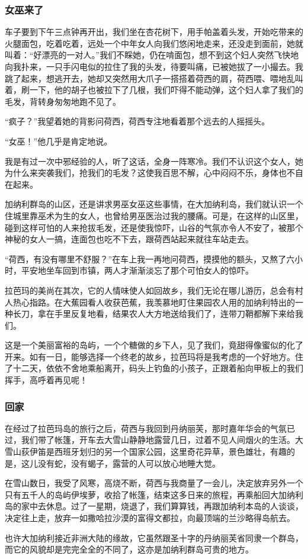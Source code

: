 \subsubsection*{女巫来了}
\par 车子要到下午三点钟再开出，我们坐在杏花树下，用手帕盖着头发，开始吃带来的火腿面包，吃着吃着，远处一个中年女人向我们悠闲地走来，还没走到面前，她就叫着：“好漂亮的一对人。”我们不睬她，仍在啃面包，想不到这个妇人突然飞快地向我扑来，一只手闪电似的拉住了我的头发，待要叫痛，已被她拔了一小撮去。我跳了起来，想逃开去，她却又突然用大爪子一搭搭着荷西的肩，荷西喂、喂地乱叫着，刷一下，他的胡子也被拉下了几根，我们吓得不能动弹，这个妇人拿了我们的毛发，背转身匆匆地跑不见了。
\par “疯子？”我望着她的背影问荷西，荷西专注地看着那个远去的人摇摇头。
\par “女巫！”他几乎是肯定地说。
\par 我是有过一次中邪经验的人，听了这话，全身一阵寒冷。我们不认识这个女人，她为什么来突袭我们，抢我们的毛发？这使我百思不解，心中闷闷不乐，身体也不自在起来。
\par 加纳利群岛的山区，还是讲求男巫女巫这些事情，在大加纳利岛，我们就认识一个住城里靠巫术为生的女人，也曾给男巫医治过我的腰痛。可是，在这样的山区里，碰到这样可怕的人来抢拔毛发，还是使我惊吓，山谷的气氛亦令人不安了，被那个神秘的女人一搞，连面包也吃不下去，跟荷西站起来就往车站走去。
\par “荷西，有没有哪里不舒服？”在车上我一再地问荷西，摸摸他的额头，又熬了六小时，平安地坐车回到市镇，两人才渐渐淡忘了那个可怕女人的惊吓。
\par 拉芭玛的美尚在其次，它的人情味使人如回故乡，我们无论在哪儿游历，总会有村人热心指路。在大蕉园看人收获芭蕉，我羡慕地盯住果园农人用的加纳利特出的一种长刀，拿在手里反复地看，结果农人大方地送给我们了，连带刀鞘都解下来给我们。
\par 这是一个美丽富裕的岛屿，一个个糖做的乡下人，见了我们，竟甜得像蜜似的化了开来。如有一日，能够选择一个终老的故乡，拉芭玛将是我考虑的一个好地方。住了十二天，依依不舍地乘船离开，码头上钓鱼的小孩子，正跟着船向甲板上的我们挥手，高呼着再见呢！
\subsubsection*{回家}
\par 在经过了拉芭玛岛的旅行之后，荷西与我回到丹纳丽芙，那时嘉年华会的气氛已过，我们带了帐篷，开车去大雪山静静地露营几日，过着不见人间烟火的生活。大雪山荻伊笛是西班牙划归的另一个国家公园，这里奇花异草，景色雄壮，有趣的是，这儿没有蛇，没有蝎子，露营的人可以放心地睡大觉。
\par 在雪山数日，我受了风寒，高烧不断，荷西与我商量了一会儿，决定放弃另外一个只有五千人的岛屿伊埃萝，收拾了帐篷，结束这多日来的旅程，再乘船回大加纳利岛的家中去休息。过了一星期，烧退了，我们算算钱，再跟加纳利本岛的人谈谈，决定往上走，放弃一如撒哈拉沙漠的富得文都拉，向最顶端的兰沙略得岛航去。
\par 也许大加纳利接近非洲大陆的缘故，它虽然跟圣十字的丹纳丽芙省同隶一个群岛，而它的风貌却是完完全全的不同了，这亦是加纳利群岛可贵的地方。
